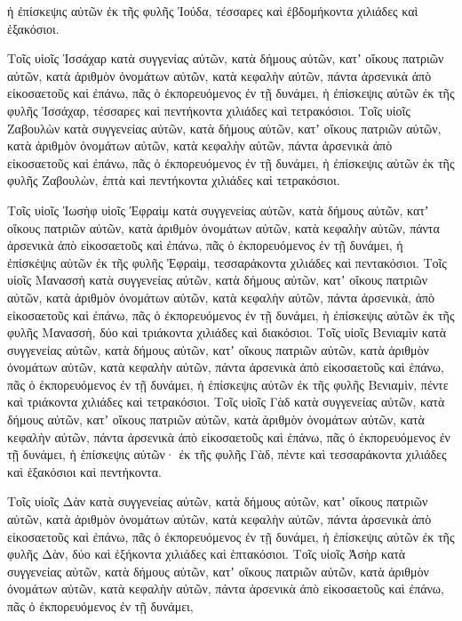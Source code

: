 {ἡ ἐπίσκεψις αὐτῶν ἐκ τῆς φυλῆς Ἰούδα, τέσσαρες καὶ ἑβδομήκοντα χιλιάδες καὶ ἑξακόσιοι.
\par }{\PP {}Τοῖς υἱοῖς Ἰσσάχαρ κατὰ συγγενίας αὐτῶν, κατὰ δήμους αὐτῶν, κατʼ οἴκους πατριῶν αὐτῶν, κατὰ ἀριθμὸν ὀνομάτων αὐτῶν, κατὰ κεφαλὴν αὐτῶν, πάντα ἀρσενικὰ ἀπὸ εἰκοσαετοῦς καὶ ἐπάνω, πᾶς ὁ ἐκπορευόμενος ἐν τῇ δυνάμει,
ἡ ἐπίσκεψις αὐτῶν ἐκ τῆς φυλῆς Ἰσσάχαρ, τέσσαρες καὶ πεντήκοντα χιλιάδες καὶ τετρακόσιοι.
Τοῖς υἱοῖς Ζαβουλὼν κατὰ συγγενείας αὐτῶν, κατὰ δήμους αὐτῶν, κατʼ οἴκους πατριῶν αὐτῶν, κατὰ ἀριθμὸν ὀνομάτων αὐτῶν, κατὰ κεφαλὴν αὐτῶν, πάντα ἀρσενικὰ ἀπὸ εἰκοσαετοῦς καὶ ἐπάνω, πᾶς ὁ ἐκπορευόμενος ἐν τῇ δυνάμει,
ἡ ἐπίσκεψις αὐτῶν ἐκ τῆς φυλῆς Ζαβουλὼν, ἑπτὰ καὶ πεντήκοντα χιλιάδες καὶ τετρακόσιοι.
\par }{\PP {}Τοῖς υἱοῖς Ἰωσὴφ υἱοῖς Ἐφραὶμ κατὰ συγγενείας αὐτῶν, κατὰ δήμους αὐτῶν, κατʼ οἴκους πατριῶν αὐτῶν, κατὰ ἀριθμὸν ὀνομάτων αὐτῶν, κατὰ κεφαλὴν αὐτῶν, πάντα ἀρσενικὰ ἀπὸ εἰκοσαετοῦς καὶ ἐπάνω, πᾶς ὁ ἐκπορευόμενος ἐν τῇ δυνάμει,
ἡ ἐπίσκέψις αὐτῶν ἐκ τῆς φυλῆς Ἐφραὶμ, τεσσαράκοντα χιλιάδες καὶ πεντακόσιοι.
Τοῖς υἱοῖς Μανασσὴ κατὰ συγγενείας αὐτῶν, κατὰ δήμους αὐτῶν, κατʼ οἴκους πατριῶν αὐτῶν, κατὰ ἀριθμὸν ὀνομάτων αὐτῶν, κατὰ κεφαλὴν αὐτῶν, πάντα ἀρσενικὰ, ἀπὸ εἰκοσαετοῦς καὶ ἐπάνω, πᾶς ὁ ἐκπορευόμενος ἐν τῇ δυνάμει,
ἡ ἐπίσκεψις αὐτῶν ἐκ τῆς φυλῆς Μανασσὴ, δύο καὶ τριάκοντα χιλιάδες καὶ διακόσιοι.
Τοῖς υἱοῖς Βενιαμὶν κατὰ συγγενείας αὐτῶν, κατὰ δήμους αὐτῶν, κατʼ οἴκους πατριῶν αὐτῶν, κατὰ ἀριθμὸν ὀνομάτων αὐτῶν, κατὰ κεφαλὴν αὐτῶν, πάντα ἀρσενικὰ ἀπὸ εἰκοσαετοῦς καὶ ἐπάνω, πᾶς ὁ ἐκπορευόμενος ἐν τῇ δυνάμει,
ἡ ἐπίσκεψις αὐτῶν ἐκ τῆς φυλῆς Βενιαμὶν, πέντε καὶ τριάκοντα χιλιάδες καὶ τετρακόσιοι.
Τοῖς υἱοῖς Γὰδ κατὰ συγγενείας αὐτῶν, κατὰ δήμους αὐτῶν, κατʼ οἴκους πατριῶν αὐτῶν, κατὰ ἀριθμὸν ὀνομάτων αὐτῶν, κατὰ κεφαλὴν αὐτῶν, πάντα ἀρσενικὰ ἀπὸ εἰκοσαετοῦς καὶ ἐπάνω, πᾶς ὁ ἐκπορευόμενος ἐν τῇ δυνάμει,
ἡ ἐπίσκεψις αὐτῶν· ἐκ τῆς φυλῆς Γὰδ, πέντε καὶ τεσσαράκοντα χιλιάδες καὶ ἑξακόσιοι καὶ πεντήκοντα.
\par }{\PP {}Τοῖς υἱοῖς Δὰν κατὰ συγγενείας αὐτῶν, κατὰ δήμους αὐτῶν, κατʼ οἴκους πατριῶν αὐτῶν, κατὰ ἀριθμὸν ὀνομάτων αὐτῶν, κατὰ κεφαλὴν αὐτῶν, πάντα ἀρσενικὰ ἀπὸ εἰκοσαετοῦς καὶ ἐπάνω, πᾶς ὁ ἐκπορευόμενος ἐν τῇ δυνάμει,
ἡ ἐπίσκεψις αὐτῶν ἐκ τῆς φυλῆς Δὰν, δύο καὶ ἑξήκοντα χιλιάδες καὶ ἑπτακόσιοι.
Τοῖς υἱοῖς Ἀσὴρ κατὰ συγγενείας αὐτῶν, κατὰ δήμους αὐτῶν, κατʼ οἴκους πατριῶν αὐτῶν, κατὰ ἀριθμὸν ὀνομάτων αὐτῶν, κατὰ κεφαλὴν αὐτῶν, πάντα ἀρσενικὰ ἀπὸ εἰκοσαετοῦς καὶ ἐπάνω, πᾶς ὁ ἐκπορευόμενος ἐν τῇ δυνάμει,
}
